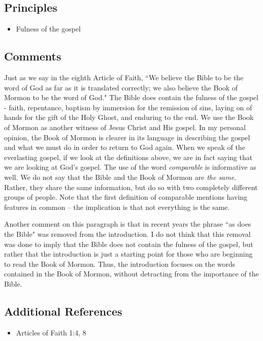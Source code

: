\documentclass[12pt]{report}
\begin{document}
\subsection{Principles\label{intro:principles1}}
\begin{itemize}
\item {} Fulness of the gospel
\end{itemize}

\subsection{Comments\label{intro:comments1}}
Just as we say in the eighth Article of Faith, ``We believe the Bible to be the word of God as far as it is translated correctly; we also believe the Book of Mormon to be the word of God."  The Bible does contain the fulness of the gospel - faith, repentance, baptism by immersion for the remission of sins, laying on of hands for the gift of the Holy Ghost, and enduring to the end.  We use the Book of Mormon as another witness of Jesus Christ and His gospel.  In my personal opinion, the Book of Mormon is clearer in its language in describing the gospel and what we must do in order to return to God again.  When we speak of the everlasting gospel, if we look at the definitions above, we are in fact saying that we are looking at God's gospel.  The use of the word \emph{comparable} is informative as well.  We do not say that the Bible and the Book of Mormon are \emph{the same}.  Rather, they share the same information, but do so with two completely different groups of people.  Note that the first definition of comparable mentions having features in common -- the implication is that not everything is the same.

Another comment on this paragraph is that in recent years the phrase ``as does the Bible" was removed from the introduction.  I do not think that this removal was done to imply that the Bible does not contain the fulness of the gospel, but rather that the introduction is just a starting point for those who are beginning to read the Book of Mormon.  Thus, the introduction focuses on the words contained in the Book of Mormon, without detracting from the importance of the Bible.

\subsection{Additional References\label{intro:references1}}
\begin{itemize}
\item Articles of Faith 1:4, 8
\end{itemize}
\end{document}

